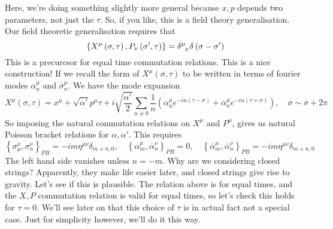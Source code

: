 \documentclass[11pt, oneside]{article}   	%
\theoremstyle{slanted}
\begin{document}
Here, we're doing something slightly more 
general because $ x , p $ depends 
two parameters, not just the $ \tau $. 
So, if you like, this 
is a field theory generalisation. 
Our field theoretic generalisation 
requires that 
\[
	\left\{ X ^ \mu \left( \sigma, \tau  \right) , P _ \nu 
	\left( \sigma ' , \tau  \right)  \right\}    = \delta \indices{ ^ \mu _ \nu } 
	\delta \left( \sigma - \sigma  '  \right) 
\]   This is a precurcsor 
for equal time commutation relations. 
This is a nice construction! 
If we recall the form of $ X ^ \mu \left( \sigma, \tau  \right)  $ 
to be written in terms of fourier modes $ \alpha^ \mu _ n  $
and $ \overline{ \sigma } ^ \mu _ n $. 
We have the 
mode expansion 
\[
	X^ \mu \left( \sigma, \tau  \right)   = x ^ \mu 
	+ \sqrt{ \alpha  ' }  p ^ \mu \tau  +  i \sqrt{ \frac{\alpha ' }{ 2 } }  
	\sum_{ n \neq 0 } \frac{1}{n } \left( 
	\alpha ^ \mu _ n e ^{   -in \left( \tau  - \sigma  \right)  } + 
\overline{ \alpha } ^ \mu _ n e ^{  - in \left( \tau + \sigma  \right)  } \right) , 
\quad \sigma \sim \sigma + 2 \pi 
\]  So imposing 
the natural commutation relations on 
$ X ^ \mu $ and $ P ^ \mu $, gives 
us natural Poisson bracket relations 
for $ \alpha , \alpha ' $. 
This requires 
\[
 \left\{  \sigma _ \mu ^ \nu , \sigma _ n ^ \nu  \right\}  _{ P B } 
  = - i m \eta ^{ \mu \nu } \delta _{ m + n , 0 }, \quad 
  \left\{  \alpha ^ \mu _ m , \overline{ \alpha } ^ \nu _ n  \right\}  _{ P B }  = 0 , \quad 
  \left\{  \overline{ \alpha } ^ \mu _ m , \overline{ \alpha } ^ \nu _ n  \right\}  _{ P B } 
   =   - i m \eta ^{ \mu \nu } \delta _{ m + n , 0 }
\] The left hand side 
vanishes unless $ n  =- m $. Why are we considering closed strings? 
Apparently, they make life easier later, 
and closed strings give rise to gravity. 
Let's see if this is plausible. 
The relation above is for equal times, 
and the $ X , P $ commutation relation 
is valid for equal times, 
so let's check this holds for $ \tau  = 0$. 
We'll see later on that this 
choice of $ \tau $ is in actual fact not a special case. 
Just for simplicity however, we'll do it this way. 
\end{document}
